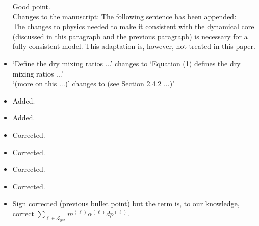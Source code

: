 \documentclass[11pt]{article}
\begin{document}
\begin{itemize}
Good point. \\

Changes to the manuscript: The following sentence has been appended:\\

The changes to physics needed to make it consistent with the dynamical core (discussed in this paragraph and the previous paragraph) is necessary for a fully consistent model. This adaptation is, however, not treated in this paper.

\item {\color{blue}{L129: The first sentence is a bit awkward to read. Why not ``Equation 1 defines ... `` L159: ``... (more on this ...) ``}}

`Define the dry mixing ratios ...' changes to `Equation (1) defines the dry mixing ratios ...'\\

`(more on this ...)' changes to (see Section 2.4.2 ...)'

\item {}

Added.

\item {}

Added. {\color{blue}{Is (26) correct.}}

\item {}

Corrected.

\item {}

Corrected.

\item {}

Corrected.

\item {\color{blue}{Eq.33-35: left hand side, 2nd term has wrong sign }}

Corrected.

\item {}

Sign corrected (previous bullet point) but the term is, to our knowledge, correct $\sum_{\ell \in \mathcal{L}_{gas}}m^{(\ell)} \alpha^{(\ell)}dp^{(\ell)}$.


\end{itemize}
\end{document}
